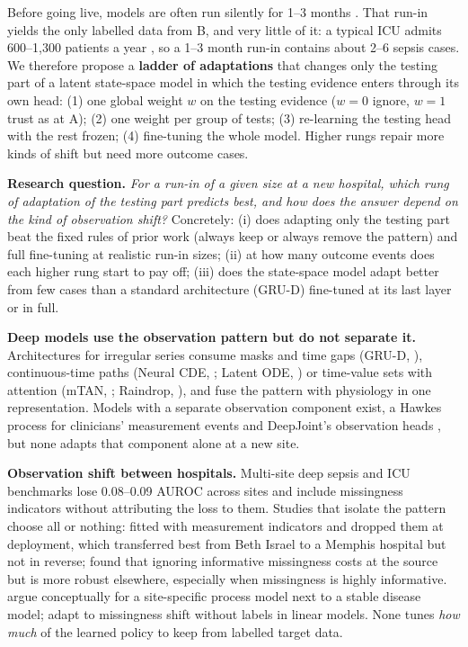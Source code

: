 \documentclass{article}
\theoremstyle{plain}
\theoremstyle{definition}
\theoremstyle{remark}
\begin{document}
Before going live, models are often run silently for 1--3 months \citep{sendak2020}. That run-in yields the only labelled data from B, and very little of it: a typical ICU admits 600--1{,}300 patients a year \citep{checkley2014}, so a 1--3 month run-in contains about 2--6 sepsis cases. We therefore propose a \textbf{ladder of adaptations} that changes only the testing part of a latent state-space model in which the testing evidence enters through its own head: (1) one global weight $w$ on the testing evidence ($w{=}0$ ignore, $w{=}1$ trust as at A); (2) one weight per group of tests; (3) re-learning the testing head with the rest frozen; (4) fine-tuning the whole model. Higher rungs repair more kinds of shift but need more outcome cases.

\textbf{Research question.} \emph{For a run-in of a given size at a new hospital, which rung of adaptation of the testing part predicts best, and how does the answer depend on the kind of observation shift?} Concretely: (i) does adapting only the testing part beat the fixed rules of prior work (always keep or always remove the pattern) and full fine-tuning at realistic run-in sizes; (ii) at how many outcome events does each higher rung start to pay off; (iii) does the state-space model adapt better from few cases than a standard architecture (GRU-D) fine-tuned at its last layer or in full.

\textbf{Deep models use the observation pattern but do not separate it.} Architectures for irregular series consume masks and time gaps (GRU-D, \citealp{che2018}), continuous-time paths (Neural CDE, \citealp{kidger2020}; Latent ODE, \citealp{rubanova2019}) or time-value sets with attention (mTAN, \citealp{shukla2021}; Raindrop, \citealp{zhang2022}), and fuse the pattern with physiology in one representation. Models with a separate observation component exist, a Hawkes process for clinicians' measurement events \citep{alaa2017} and DeepJoint's observation heads \citep{jeanselme2022}, but none adapts that component alone at a new site.

\textbf{Observation shift between hospitals.} Multi-site deep sepsis and ICU benchmarks lose 0.08--0.09 AUROC across sites \citep{moor2023,yaib2024} and include missingness indicators without attributing the loss to them. Studies that isolate the pattern choose all or nothing: \citet{futoma2021} fitted with measurement indicators and dropped them at deployment, which transferred best from Beth Israel to a Memphis hospital but not in reverse; \citet{rockenschaub2024} found that ignoring informative missingness costs at the source but is more robust elsewhere, especially when missingness is highly informative. \citet{lasko2024} argue conceptually for a site-specific process model next to a stable disease model; \citet{zhou2023} adapt to missingness shift without labels in linear models. None tunes \emph{how much} of the learned policy to keep from labelled target data.
\end{document}
